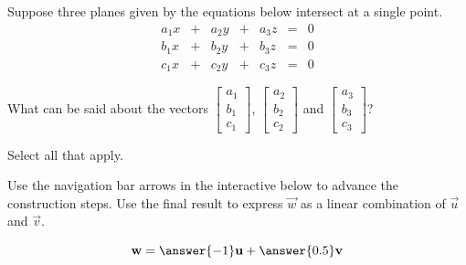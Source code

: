 \documentclass{ximera}
\begin{document}
\begin{exercise}
Suppose three planes given by the equations below intersect at a single point.
$$\begin{matrix}
      a_1x& +&a_2y&+&a_3z&=&0\\
      b_1x & +&b_2y&+&b_3z&= &0\\
      c_1x&+&c_2y&+&c_3z&=&0
    \end{matrix}$$
 
What can be said about the vectors $\begin{bmatrix}a_1\\b_1\\c_1\end{bmatrix}$, $\begin{bmatrix}a_2\\b_2\\c_2\end{bmatrix}$ and $\begin{bmatrix}a_3\\b_3\\c_3\end{bmatrix}$?  
 
Select all that apply.
 
\begin{selectAll}
 \end{selectAll}
\end{exercise}

\begin{exercise}
Use the navigation bar arrows in the interactive below to advance the construction steps.  Use the final result to express $\vec{w}$ as a linear combination of $\vec{u}$ and $\vec{v}$.
 
\begin{center}
\end{center}
 
$$\vec{w}=\answer{-1}\vec{u}+\answer{0.5}\vec{v}$$
\end{exercise}
\end{document}
